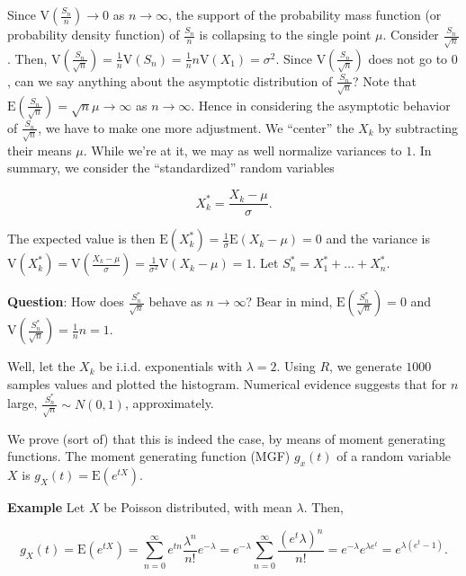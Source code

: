 \documentclass[12pt]{article}
\newcommand{\expected}[1]{\text{E}(#1)}
\newcommand{\variance}[1]{\text{V}(#1)}
\begin{document}
\noindent
Since $\variance{\frac{S_n}{n}} \rightarrow 0$ as $n \rightarrow \infty$, the support of the probability mass function (or probability density function) of $\frac{S_n}{n}$ is collapsing to the single point $\mu$. Consider $\frac{S_n}{\sqrt{n}}$. Then, $\variance{\frac{S_n}{\sqrt{n}}} = \frac{1}{n} \variance{S_n} = \frac{1}{n} n \variance{X_1} = \sigma^2$. Since $\variance{\frac{S_n}{\sqrt{n}}}$ does not go to $0$, can we say anything about the asymptotic distribution of $\frac{S_n}{\sqrt{n}}$? Note that $\expected{\frac{S_n}{\sqrt{n}}} = \sqrt{n} \mu \rightarrow \infty$ as $n \rightarrow \infty$. Hence in considering the asymptotic behavior of $\frac{S_n}{\sqrt{n}}$, we have to make one more adjustment. We ``center'' the $X_k$ by subtracting their means $\mu$. While we're at it, we may as well normalize variances to $1$. In summary, we consider the ``standardized'' random variables

\begin{equation*}
X_{k}^{*} = \frac{X_k - \mu}{\sigma}.
\end{equation*}

\noindent
The expected value is then $\expected{X_{k}^{*}} = \frac{1}{\sigma} \expected{X_k - \mu} = 0$ and the variance is $\variance{X_{k}^{*}} = \variance{\frac{X_{k} - \mu}{\sigma}} = \frac{1}{\sigma^2} \variance{X_k - \mu} = 1$. Let $S_{n}^{*} = X_{1}^{*} + \ldots + X_{n}^{*}$. 

\vspace*{.5cm}
\noindent
\textbf{Question}: How does $\frac{S_{n}^{*}}{\sqrt{n}}$ behave as $n \rightarrow \infty$? Bear in mind, $\expected{\frac{S_{n}^{*}}{\sqrt{n}}} = 0$ and $\variance{\frac{S_{n}^{*}}{\sqrt{n}}} = \frac{1}{n} n = 1$.

\vspace*{.5cm}
\noindent
Well, let the $X_k$ be i.i.d. exponentials with $\lambda = 2$. Using $R$, we generate $1000$ samples values and plotted the histogram. Numerical evidence suggests that for $n$ large, $\frac{S_{n}^{*}}{\sqrt{n}} \sim N(0,1)$, approximately.


\vspace*{.5cm}
\noindent
We prove (sort of) that this is indeed the case, by means of moment generating functions. The moment generating function (MGF) $g_x(t)$ of a random variable $X$ is $g_X(t) = \expected{e^{tX}}$. 

\begin{tcolorbox}
\textbf{Example} Let $X$ be Poisson distributed, with mean $\lambda$. Then, 

\begin{equation*}
g_X(t) = \expected{e^{tX}} = \sum_{n=0}^{\infty} e^{tn} \frac{\lambda^n}{n!} e^{- \lambda} = e^{- \lambda} \sum_{n=0}^{\infty} \frac{(e^{t}\lambda)^n}{n!} = e^{- \lambda} e^{\lambda e^{t}} = e^{\lambda (e^{t} - 1)}.
\end{equation*}
\end{tcolorbox}
\end{document}
